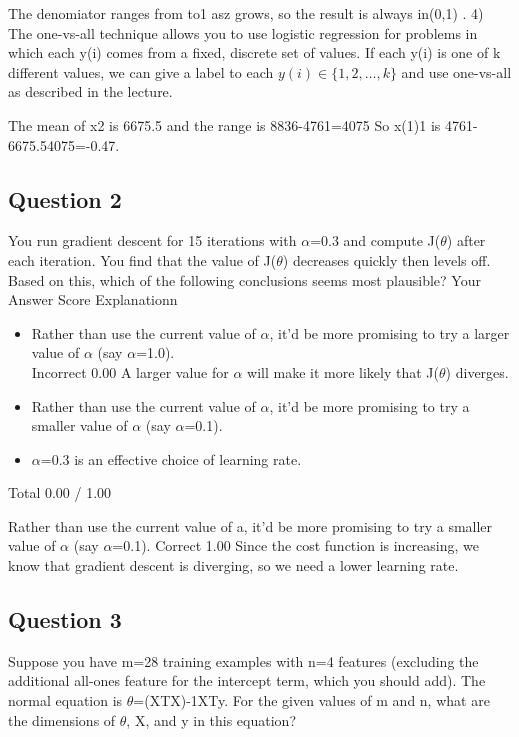 \documentclass[11pt]{article} %
\begin{document}
The denomiator ranges from  to1 asz grows, so the result is always in(0,1) . 
4)
The one-vs-all technique allows you to use logistic regression for problems in which each y(i) comes from a fixed, discrete set of values. 
If each y(i) is one of k different values, we can give a label to each $y(i)\in\{1,2,\ldots,k\}$ and use one-vs-all as described in the lecture. 







The mean of x2 is 6675.5 and the range is 8836-4761=4075 So x(1)1 is 4761-6675.54075=-0.47.

\subsection*{Question 2}
You run gradient descent for 15 iterations with $\alpha$=0.3 and compute J($\theta$) after each iteration. 
You find that the value of J($\theta$) decreases quickly then levels off. Based on this, which of the following conclusions seems most plausible?
Your Answer		Score	Explanationn
\begin{itemize}
	\item Rather than use the current value of $\alpha$, it'd be more promising to try a larger value of $\alpha$ (say $\alpha$=1.0).
	\\ Incorrect	0.00	 A larger value for $\alpha$ will make it more likely that J($\theta$) diverges.
	\item Rather than use the current value of $\alpha$, it'd be more promising to try a smaller value of $\alpha$ (say $\alpha$=0.1).			
	\item $\alpha$=0.3 is an effective choice of learning rate.			
\end{itemize}
Total		0.00 / 1.00	

Rather than use the current value of a, it'd be more promising to try a smaller value of $\alpha$ (say $\alpha$=0.1).	Correct	1.00	 
Since the cost function is increasing, we know that gradient descent is diverging, so we need a lower learning rate.
\subsection*{Question 3}
Suppose you have m=28 training examples with n=4 features (excluding the additional 
all-ones feature for the intercept term, which you should add). The normal equation is $\theta$=(XTX)-1XTy. 
For the given values of m and n, what are the dimensions of $\theta$, X, and y in this equation?
\end{document}
